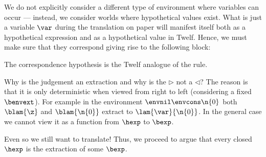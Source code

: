 \Twelf
We do not explicitly consider a different type of environment where variables can occur --- instead, we consider worlds where hypothetical values exist.
What is just a variable $\var$ during the translation on paper will manifest itself both as a hypothetical \hlang expression and as a hypothetical \blang value in Twelf.
Hence, we must make sure that they correspond giving rise to the following block:

The correspondence hypothesis is the Twelf analogue of the  rule.

Why is the judgement an extraction and why is the $\rhd$ not a $\lhd$?
The reason is that it is only deterministic when viewed from right to left (considering a fixed $\benvext$).
For example in the environment $\envnil \envcons \n{0}$ both $\blam{\z}$ and $\blam{\n{0}}$ extract to $\lam{\var}{\n{0}}$.
In the general case we cannot view it as a function from $\hexp$ to $\bexp$.

Even so we still want to translate!
Thus, we proceed to argue that every closed $\hexp$ is the extraction of some $\bexp$.
